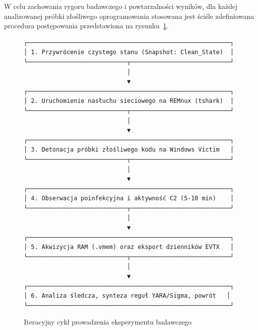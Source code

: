 W celu zachowania rygoru badawczego i powtarzalności wyników, dla każdej analizowanej próbki złośliwego oprogramowania stosowana jest ściśle zdefiniowana procedura postępowania przedstawiona na rysunku~\ref{fig:cykl_badawczy}.

\begin{figure}[htbp]
\centering
\begin{verbatim}
┌─────────────────────────────────────────────────────────┐
│ 1. Przywrócenie czystego stanu (Snapshot: Clean_State)  │
└────────────────────────────┬────────────────────────────┘
                             │
                             ▼
┌─────────────────────────────────────────────────────────┐
│ 2. Uruchomienie nasłuchu sieciowego na REMnux (tshark)  │
└────────────────────────────┬────────────────────────────┘
                             │
                             ▼
┌─────────────────────────────────────────────────────────┐
│ 3. Detonacja próbki złośliwego kodu na Windows Victim   │
└────────────────────────────┬────────────────────────────┘
                             │
                             ▼
┌─────────────────────────────────────────────────────────┐
│ 4. Obserwacja poinfekcyjna i aktywność C2 (5-10 min)    │
└────────────────────────────┬────────────────────────────┘
                             │
                             ▼
┌─────────────────────────────────────────────────────────┐
│ 5. Akwizycja RAM (.vmem) oraz eksport dzienników EVTX   │
└────────────────────────────┬────────────────────────────┘
                             │
                             ▼
┌─────────────────────────────────────────────────────────┐
│ 6. Analiza śledcza, synteza reguł YARA/Sigma, powrót   │
└─────────────────────────────────────────────────────────┘
\end{verbatim}
\caption{Iteracyjny cykl prowadzenia eksperymentu badawczego}
\label{fig:cykl_badawczy}
\end{figure}